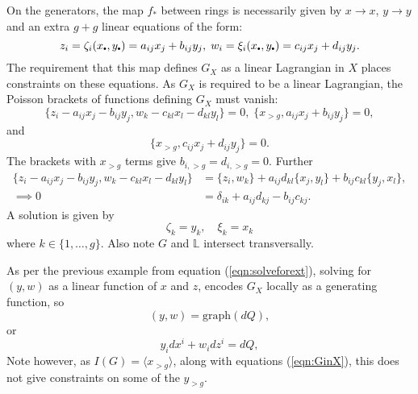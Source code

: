    On the generators, the map \(f_{*}\) between rings is necessarily given by \(x\rightarrow x\), \(y\rightarrow y\) and an extra \(g+g\) linear equations of the form:
    \begin{equation} z_i = \zeta_i(x_{\sbt},y_{\sbt}) = a_{ij} x_j + b_{ij} y_j, \; w_i = \xi_i(x_{\sbt},y_{\sbt}) = c_{ij} x_j+ d_{ij} y_j.\end{equation}
    The requirement that this map defines \(G_X\) as a linear Lagrangian in \(X\) places constraints on these equations. As \(G_X\) is required to be a linear Lagrangian, the Poisson brackets of functions defining \(G_X\) must vanish:
    \[  \{ z_i - a_{ij} x_j - b_{ij} y_j,w_k -c_{kl}  x_l- d_{kl} y_l\}=0,\;  \{x_{>g},a_{ij} x_j + b_{ij} y_j\}=0,\] and 
    \[\{x_{>g}, c_{ij} x_j+ d_{ij} y_j\}=0. \]
    The brackets with \(x_{>g}\) terms give \(b_{i,>g} = d_{i,>g} = 0\).
    Further 
    \begin{align*}
         \{ z_i - a_{ij} x_j - b_{ij} y_j,w_k -c_{kl} x_l- d_{kl} y_l\} &= \{z_i,w_k\} + a_{ij}d_{kl}\{x_j,y_l\}+b_{ij}c_{kl}\{y_j,x_l\}, \\
         \implies 0 &= \delta_{ik}+a_{ij}d_{kj} -b_{ij}c_{kj}. 
    \end{align*}
    A solution is given by 
    \begin{equation} 
    \label{eqn:GinX}
    \zeta_k= y_{k}, \quad \xi_k= x_{k}
    \end{equation} 
    where \(k \in \{1,\dots ,g\}\). Also note \( G\) and \(\mathbb{L}\) intersect transversally. 
    
    As per the previous example from equation (\ref{eqn:solveforext}), solving for \((y,w)\) as a linear function of \(x\) and \(z\), encodes \(G_X\) locally as a generating function, so 
    \[ (y,w) = \mathrm{graph}(dQ),\]
    or 
    \[ y_i dx^i + w_i dz^i = dQ,\]
    Note however, as \(I(G) = \langle x_{>g}\rangle \), along with equations (\ref{eqn:GinX}), this does not give constraints on some of the \(y_{>g}\).
    
